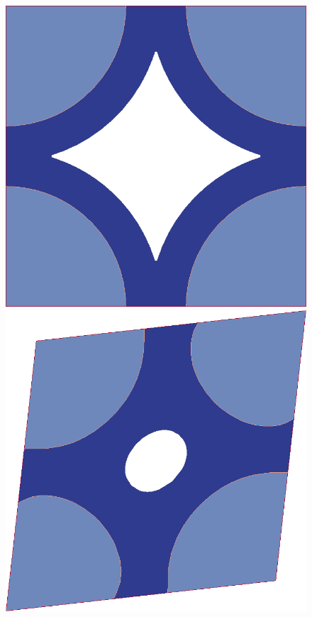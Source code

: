 \documentclass[11pt,a4paper]{article}
\begin{document}
\begin{figure}[thpb!]
  \centering
  \includegraphics[scale=0.12]{figures/evolve_a}
  \hspace{1em}
  \includegraphics[scale=0.12]{figures/evolve_b}

\end{figure}
\end{document}
